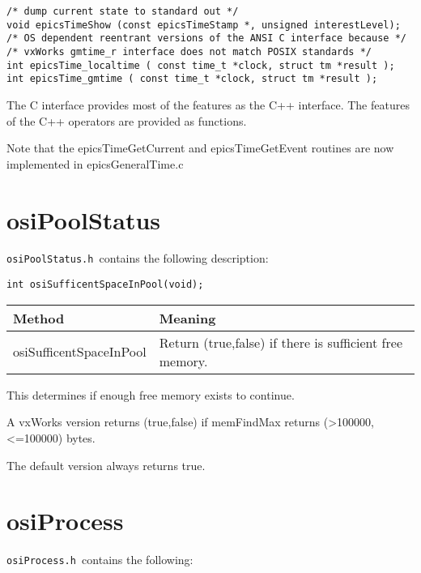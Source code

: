 \begin{verbatim}
/* dump current state to standard out */
void epicsTimeShow (const epicsTimeStamp *, unsigned interestLevel);
/* OS dependent reentrant versions of the ANSI C interface because */
/* vxWorks gmtime_r interface does not match POSIX standards */
int epicsTime_localtime ( const time_t *clock, struct tm *result );
int epicsTime_gmtime ( const time_t *clock, struct tm *result );

\end{verbatim}The C interface provides most of the features as the C++ interface. The features of the C++ operators are provided as 
functions.

Note that the epicsTimeGetCurrent and epicsTimeGetEvent routines are now implemented in epicsGeneralTime.c

\section{osiPoolStatus}

\verb|osiPoolStatus.h |contains the following description:

\begin{verbatim}int osiSufficentSpaceInPool(void);
\end{verbatim}
\begin{center}\begin{longtable}{p{1.52778in}p{3.40278in}}
\textbf{Method} & \textbf{Meaning}\\
\hline
osiSufficentSpaceInPool & Return (true,false) if there is sufficient free memory.
\end{longtable}\end{center}


This determines if enough free memory exists to continue.

A vxWorks version returns (true,false) if memFindMax returns (\textgreater{}100000, \textless{}=100000) bytes.

The default version always returns true.

\section{osiProcess}

\verb|osiProcess.h |contains the following:

